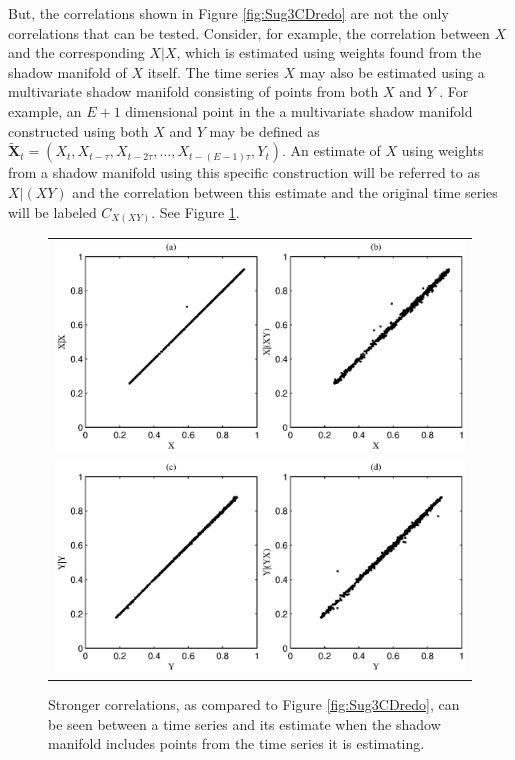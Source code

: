\documentclass[twocolumn,aps,pre,groupedaddress]{revtex4-1}
\begin{document}
But, the correlations shown in Figure \ref{fig:Sug3CDredo} are not the only correlations that can be tested.  Consider, for example, the correlation between $X$ and the corresponding $X|X$, which is estimated using weights found from the shadow manifold of $X$ itself.  The time series $X$ may also be estimated using a multivariate shadow manifold consisting of points from both $X$ and $Y$ \cite{Deyle2013}.  For example, an $E+1$ dimensional point in the a multivariate shadow manifold constructed using both $X$ and $Y$ may be defined as $\tilde{\mathbf{X}}_t=(X_t,X_{t-\tau},X_{t-2\tau},\ldots,X_{t-(E-1)\tau},Y_t)$.  An estimate of $X$ using weights from a shadow manifold using this specific construction will be referred to as $X|(XY)$ and the correlation between this estimate and the original time series will be labeled $C_{X(XY)}$.  See Figure \ref{fig:PAIintro}.
\begin{figure}[ht]
\begin{tabular}{c}
\includegraphics[scale=0.5]{SugFig3CD_AddPlotAB.eps} \\
\includegraphics[scale=0.5]{SugFig3CD_AddPlotCD.eps}
\end{tabular}
\caption{Stronger correlations, as compared to Figure \ref{fig:Sug3CDredo}, can be seen between a time series and its estimate when the shadow manifold includes points from the time series it is estimating.}
\label{fig:PAIintro}
\end{figure}
\end{document}
